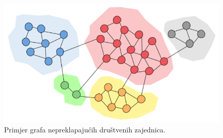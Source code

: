 \begin{figure}
	\includegraphics[width=\linewidth]{images/simple-community.png}
	\caption{Primjer grafa nepreklapajućih društvenih zajednica.}
	\label{fig:comm1}
\end{figure}
